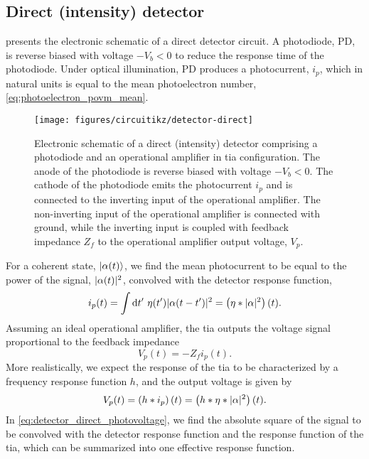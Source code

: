 \FloatBarrier
\subsection{Direct (intensity) detector}

 presents the electronic schematic of a direct detector circuit.
A photodiode, PD, is reverse biased with voltage $-V_b<0$ to reduce the response time of the photodiode.
Under optical illumination, PD produces a photocurrent, $i_p$, which in natural units is equal to the mean photoelectron number, \cref{eq:photoelectron_povm_mean}.
\begin{figure}[htb]
    \centering
    \texttt{[image: figures/circuitikz/detector-direct]}
    \caption{Electronic schematic of a direct (intensity) detector comprising a photodiode and an operational amplifier in \gls{tia} configuration. The anode of the photodiode is reverse biased with voltage $-V_b<0$. The cathode of the photodiode emits the photocurrent $i_p$ and is connected to the inverting input of the operational amplifier. The non-inverting input of the operational amplifier is connected with ground, while the inverting input is coupled with feedback impedance $Z_f$ to the operational amplifier output voltage, $V_p$.}\label{fig:detector_direct}
\end{figure}
For a coherent state, $\lvert\alpha(t)\rangle$, we find the mean photocurrent to be equal to the power of the signal, $\lvert\alpha(t)\rvert^2$, convolved with the detector response function,
\begin{equation}
	i_p(t)
	=
	\int\dd{t^\prime}
	\eta(t^\prime)
	\abs{\alpha(t-t^\prime)}^2
	=
	\left(\eta*\abs{\alpha}^2\right)(t)
	\label{eq:detector_direct_photocurrent}
	.
\end{equation}
Assuming an ideal operational amplifier, the \gls{tia} outputs the voltage signal proportional to the feedback impedance
\begin{equation}
	V_p(t)
	=
	-
	Z_f
	i_p(t)
	.
\end{equation}
More realistically, we expect the response of the \gls{tia} to be characterized by a frequency response function $h$, and the output voltage is given by
\begin{equation}
	V_p(t)
	=
	\left(h*i_p\right)(t)
	=
	\left(h*\eta*\lvert\alpha\rvert^2\right)(t)
	\label{eq:detector_direct_photovoltage}
	.
\end{equation}
In \cref{eq:detector_direct_photovoltage}, we find the absolute square of the signal to be convolved with the detector response function and the response function of the \gls{tia}, which can be summarized into one effective response function.

